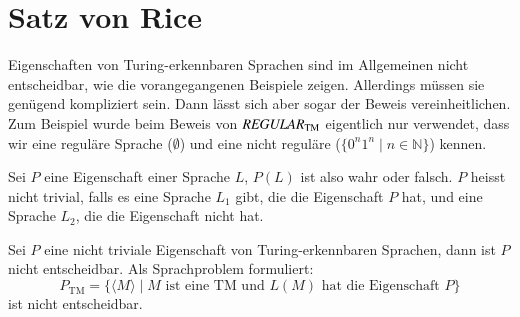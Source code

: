 %
%
%

\section{Satz von Rice}
Eigenschaften von Turing-erkennbaren Sprachen sind im Allgemeinen
nicht entscheidbar, wie die vorangegangenen Beispiele zeigen.
Allerdings müssen sie genü\-gend kompliziert sein.
Dann lässt
sich aber sogar der Beweis vereinheitlichen.
Zum Beispiel wurde
beim Beweis von $\text{\it REGULAR}_{\text{TM}}$ eigentlich
nur verwendet, dass wir eine reguläre Sprache ($\emptyset$) und
eine nicht reguläre ($\{0^n1^n\;|\;n\in\mathbb N\}$) kennen.

\begin{definition}
%
Sei $P$ eine Eigenschaft einer Sprache $L$, $P(L)$ ist also wahr oder
falsch.
$P$ heisst nicht trivial, falls es eine Sprache $L_1$ gibt,
die die Eigenschaft $P$ hat, und eine Sprache $L_2$, die die
Eigenschaft nicht hat.
\end{definition}

\begin{satz}[Rice]
%
\label{rice-theorem}
Sei $P$ eine nicht triviale Eigenschaft von Turing-erkennbaren Sprachen,
dann ist $P$ nicht entscheidbar.
Als Sprachproblem formuliert:
\[
P_{\text{TM}}=\{ \langle M\rangle\;|\;
\text{$M$ ist eine TM und $L(M)$ hat die Eigenschaft $P$}
\}
\]
ist nicht entscheidbar.
\end{satz}

